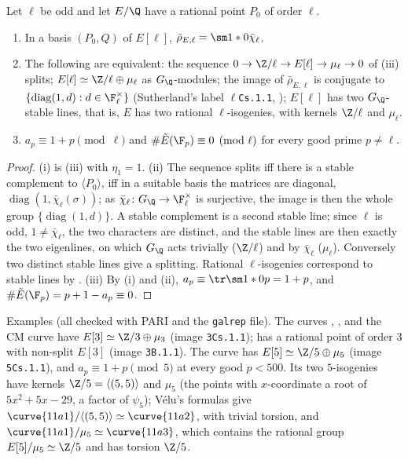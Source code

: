 \begin{proposition}\label{prop:ellcurves:zlmul}
Let $\ell$ be odd and let $E/\Q$ have a rational point $P_0$ of order $\ell$.
\begin{enumerate}[label=(\roman*)]
\item In a basis $(P_0,Q)$ of $E[\ell]$, $\bar\rho_{E,\ell}=\sm1*0{\bar\chi_\ell}$.
\item The following are equivalent: the sequence $0\to\Z/\ell\to E[\ell]\to\mu_\ell\to0$ of (iii) splits; $E[\ell]\simeq\Z/\ell\oplus\mu_\ell$ as $G_\Q$-modules; the image of
$\bar\rho_{E,\ell}$ is conjugate to $\{\operatorname{diag}(1,d):d\in\F_\ell^\times\}$ (Sutherland's label $\ell$\texttt{Cs.1.1}, ); $E[\ell]$ has two $G_\Q$-stable lines, that is,
$E$ has two rational $\ell$-isogenies, with kernels $\Z/\ell$ and $\mu_\ell$.
\item $a_p\equiv1+p\pmod\ell$ and $\#\tilde E(\F_p)\equiv0\pmod\ell$ for every good prime $p\ne\ell$.
\end{enumerate}
\end{proposition}

\begin{proof}
(i) is (iii) with $\eta_1=1$. (ii) The sequence splits iff there is a stable complement to $\langle P_0\rangle$, iff in a suitable basis the matrices are diagonal,
$\operatorname{diag}(1,\bar\chi_\ell(\sigma))$; as $\bar\chi_\ell\colon G_\Q\to\F_\ell^\times$ is surjective, the image is then the whole group $\{\operatorname{diag}(1,d)\}$. A stable complement is a second stable line; since
$\ell$ is odd, $1\ne\bar\chi_\ell$, the two characters are distinct, and the stable lines are then exactly the two eigenlines, on which $G_\Q$ acts trivially ($\Z/\ell$) and by $\bar\chi_\ell$
($\mu_\ell$). Conversely two distinct stable lines give a splitting. Rational $\ell$-isogenies correspond to stable lines by . (iii) By (i) and
(ii), $a_p\equiv\tr\sm1*0p=1+p$, and $\#\tilde E(\F_p)=p+1-a_p\equiv0$.
\end{proof}

\noindent Examples (all checked with PARI and the \texttt{galrep} file). The curves , ,  and the CM curve  have $E[3]\simeq\Z/3\oplus\mu_3$ (image
\texttt{3Cs.1.1});  has a rational point of order $3$ with non-split $E[3]$ (image \texttt{3B.1.1}). The curve  has $E[5]\simeq\Z/5\oplus\mu_5$ (image \texttt{5Cs.1.1}), and
$a_p\equiv1+p\pmod5$ at every good $p<500$. Its two $5$-isogenies have kernels $\Z/5=\langle(5,5)\rangle$ and $\mu_5$ (the points with $x$-coordinate a root of $5x^2+5x-29$, a factor of
$\psi_5$); V\'elu's formulas give $\curve{11a1}/\langle(5,5)\rangle\simeq\curve{11a2}$, with trivial torsion, and $\curve{11a1}/\mu_5\simeq\curve{11a3}$, which contains the rational group
$E[5]/\mu_5\simeq\Z/5$ and has torsion $\Z/5$.

